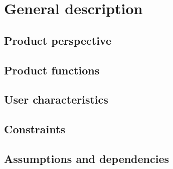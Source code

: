
\section{General description}

\subsection{Product perspective}
\subsection{Product functions}
\subsection{User characteristics}
\subsection{Constraints}
\subsection{Assumptions and dependencies}